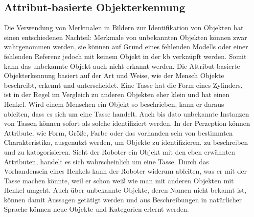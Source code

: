 \subsection{Attribut-basierte Objekterkennung}
\label{sec:aboi}

Die Verwendung von Merkmalen in Bildern zur Identifikation von Objekten hat einen entschiedenen Nachteil: Merkmale von unbekannten Objekten können zwar wahrgenommen werden, sie können auf Grund eines fehlenden Modells oder einer fehlenden Referenz jedoch mit keinem Objekt in der \gls{kb} verknüpft werden. Somit kann das unbekannte Objekt auch nicht erkannt werden. \newline
Die Attribut-basierte Objekterkennung basiert auf der Art und Weise, wie der Mensch Objekte beschreibt, erkennt und unterscheidet. Eine Tasse hat die Form eines Zylinders, ist in der Regel im Vergleich zu anderen Objekten eher klein und hat einen Henkel. Wird einem Menschen ein Objekt so beschrieben, kann er daraus ableiten, dass es sich um eine Tasse handelt. Auch bis dato unbekannte Instanzen von Tassen können sofort als solche identifiziert werden. In der Perzeption können Attribute, wie Form, Größe, Farbe oder das vorhanden sein von bestimmten Charakteristika, ausgenutzt werden, um Objekte zu identifizieren, zu beschreiben und zu katogorisieren. Sieht der Roboter ein Objekt mit den eben erwähnten Attributen, handelt es sich wahrscheinlich um eine Tasse. Durch das Vorhandensein eines Henkels kann der Roboter widerum ableiten, was er mit der Tasse machen könnte, weil er schon weiß wie man mit anderen Objekten mit Henkel umgeht. Auch über unbekannte Objekte, deren Namen nicht bekannt ist, können damit Aussagen getätigt werden und aus Beschreibungen in natürlicher Sprache können neue Objekte und Kategorien erlernt werden. \cite{descObjbyAtr, atrBasedObjIden} \par

